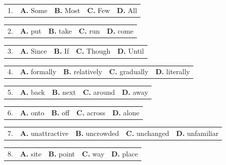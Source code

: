 \documentclass[UTF8,11pt]{ctexart}
\begin{document}
\noindent\begin{tabularx}{\linewidth}{@{}lXXXX@{}}1. & \textbf{A.} Some & \textbf{B.} Most & \textbf{C.} Few & \textbf{D.} All\\\end{tabularx}\par

\noindent\begin{tabularx}{\linewidth}{@{}lXXXX@{}}2. & \textbf{A.} put & \textbf{B.} take & \textbf{C.} run & \textbf{D.} come\\\end{tabularx}\par

\noindent\begin{tabularx}{\linewidth}{@{}lXXXX@{}}3. & \textbf{A.} Since & \textbf{B.} If & \textbf{C.} Though & \textbf{D.} Until\\\end{tabularx}\par

\noindent\begin{tabularx}{\linewidth}{@{}lXXXX@{}}4. & \textbf{A.} formally & \textbf{B.} relatively & \textbf{C.} gradually & \textbf{D.} literally\\\end{tabularx}\par

\noindent\begin{tabularx}{\linewidth}{@{}lXXXX@{}}5. & \textbf{A.} back & \textbf{B.} next & \textbf{C.} around & \textbf{D.} away\\\end{tabularx}\par

\noindent\begin{tabularx}{\linewidth}{@{}lXXXX@{}}6. & \textbf{A.} onto & \textbf{B.} off & \textbf{C.} across & \textbf{D.} alone\\\end{tabularx}\par

\noindent\begin{tabularx}{\linewidth}{@{}lXXXX@{}}7. & \textbf{A.} unattractive & \textbf{B.} uncrowded & \textbf{C.} unchanged & \textbf{D.} unfamiliar\\\end{tabularx}\par

\noindent\begin{tabularx}{\linewidth}{@{}lXXXX@{}}8. & \textbf{A.} site & \textbf{B.} point & \textbf{C.} way & \textbf{D.} place\\\end{tabularx}\par
\end{document}
